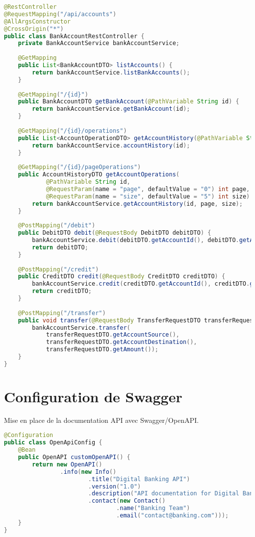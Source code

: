 \documentclass[12pt,a4paper]{report}
\begin{document}
\begin{lstlisting}[language=Java, caption=BankAccountRestController.java]
@RestController
@RequestMapping("/api/accounts")
@AllArgsConstructor
@CrossOrigin("*")
public class BankAccountRestController {
    private BankAccountService bankAccountService;
    
    @GetMapping
    public List<BankAccountDTO> listAccounts() {
        return bankAccountService.listBankAccounts();
    }
    
    @GetMapping("/{id}")
    public BankAccountDTO getBankAccount(@PathVariable String id) {
        return bankAccountService.getBankAccount(id);
    }
    
    @GetMapping("/{id}/operations")
    public List<AccountOperationDTO> getAccountHistory(@PathVariable String id) {
        return bankAccountService.accountHistory(id);
    }
    
    @GetMapping("/{id}/pageOperations")
    public AccountHistoryDTO getAccountOperations(
            @PathVariable String id,
            @RequestParam(name = "page", defaultValue = "0") int page,
            @RequestParam(name = "size", defaultValue = "5") int size) {
        return bankAccountService.getAccountHistory(id, page, size);
    }
    
    @PostMapping("/debit")
    public DebitDTO debit(@RequestBody DebitDTO debitDTO) {
        bankAccountService.debit(debitDTO.getAccountId(), debitDTO.getAmount(), debitDTO.getDescription());
        return debitDTO;
    }
    
    @PostMapping("/credit")
    public CreditDTO credit(@RequestBody CreditDTO creditDTO) {
        bankAccountService.credit(creditDTO.getAccountId(), creditDTO.getAmount(), creditDTO.getDescription());
        return creditDTO;
    }
    
    @PostMapping("/transfer")
    public void transfer(@RequestBody TransferRequestDTO transferRequestDTO) {
        bankAccountService.transfer(
            transferRequestDTO.getAccountSource(), 
            transferRequestDTO.getAccountDestination(), 
            transferRequestDTO.getAmount());
    }
}
\end{lstlisting}

\section{Configuration de Swagger}
Mise en place de la documentation API avec Swagger/OpenAPI.

\begin{lstlisting}[language=Java, caption=OpenApiConfig.java]
@Configuration
public class OpenApiConfig {
    @Bean
    public OpenAPI customOpenAPI() {
        return new OpenAPI()
                .info(new Info()
                        .title("Digital Banking API")
                        .version("1.0")
                        .description("API documentation for Digital Banking application")
                        .contact(new Contact()
                                .name("Banking Team")
                                .email("contact@banking.com")));
    }
}
\end{lstlisting}
\end{document}
